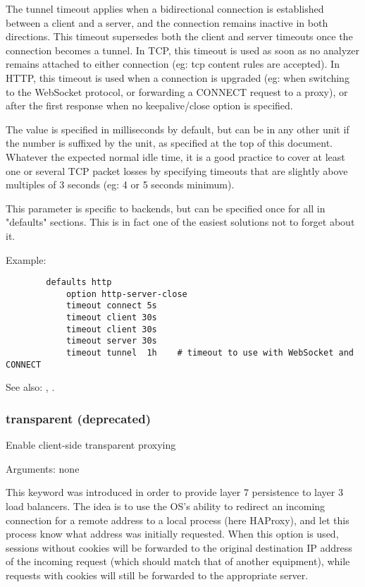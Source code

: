   The tunnel timeout applies when a bidirectional connection is established
  between a client and a server, and the connection remains inactive in both
  directions. This timeout supersedes both the client and server timeouts once
  the connection becomes a tunnel. In TCP, this timeout is used as soon as no
  analyzer remains attached to either connection (eg: tcp content rules are
  accepted). In HTTP, this timeout is used when a connection is upgraded (eg:
  when switching to the WebSocket protocol, or forwarding a CONNECT request
  to a proxy), or after the first response when no keepalive/close option is
  specified.

  The value is specified in milliseconds by default, but can be in any other
  unit if the number is suffixed by the unit, as specified at the top of this
  document. Whatever the expected normal idle time, it is a good practice to
  cover at least one or several TCP packet losses by specifying timeouts that
  are slightly above multiples of 3 seconds (eg: 4 or 5 seconds minimum).

  This parameter is specific to backends, but can be specified once for all in
  "defaults" sections. This is in fact one of the easiest solutions not to
  forget about it.

  Example:
  \begin{verbatim}
        defaults http
            option http-server-close
            timeout connect 5s
            timeout client 30s
            timeout client 30s
            timeout server 30s
            timeout tunnel  1h    # timeout to use with WebSocket and CONNECT
  \end{verbatim}

  See also: , .


\subsubsection[transparent]{transparent (deprecated)}


  Enable client-side transparent proxying


  Arguments: none

  This keyword was introduced in order to provide layer 7 persistence to layer
  3 load balancers. The idea is to use the OS's ability to redirect an incoming
  connection for a remote address to a local process (here HAProxy), and let
  this process know what address was initially requested. When this option is
  used, sessions without cookies will be forwarded to the original destination
  IP address of the incoming request (which should match that of another
  equipment), while requests with cookies will still be forwarded to the
  appropriate server.

